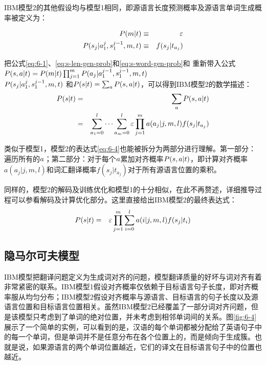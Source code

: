 \parinterval IBM模型2的其他假设均与模型1相同，即源语言长度预测概率及源语言单词生成概率被定义为：

\begin{eqnarray}
{P}(m|{t}) & \equiv & \varepsilon \label{eq:s-len-gen-prob} \\
{P}(s_j|a_1^{j},s_1^{j-1},m,{t}) & \equiv & f(s_j|t_{a_j})
\label{eq:s-word-gen-prob}
\end{eqnarray}

把公式\eqref{eq:6-1}、\eqref{eq:s-len-gen-prob}和\eqref{eq:s-word-gen-prob}和 重新带入公式${P}({s},{a}|{t})={P}(m|{t})\prod_{j=1}^{m}{{P}(a_j|a_1^{j-1},s_1^{j-1},m,{t})}$\\${{P}(s_j|a_1^{j},s_1^{j-1},m,{t})}$ 和${P}({s}|{t})= \sum_{{a}}{P}({s},{a}|{t})$，可以得到IBM模型2的数学描述：
\begin{eqnarray}
{P}({s}| {t}) & = &  \sum_{{a}}{{P}({s},{a}| {t})} \nonumber \\
                       & = & \sum_{a_1=0}^{l}{\cdots}\sum _{a_m=0}^{l}{\varepsilon}\prod_{j=1}^{m}{a(a_j|j,m,l)f(s_j|t_{a_j})}
\label{eq:6-4}
\end{eqnarray}

\parinterval 类似于模型1，模型2的表达式\eqref{eq:6-4}也能被拆分为两部分进行理解。第一部分：遍历所有的${a}$；第二部分：对于每个${a}$累加对齐概率${P}({s},{a}| {t})$，即计算对齐概率$a(a_j|j,m,l)$和词汇翻译概率$f(s_j|t_{a_j})$对于所有源语言位置的乘积。

\parinterval 同样的，模型2的解码及训练优化和模型1的十分相似，在此不再赘述，详细推导过程可以参看{\chapterfive}解码及计算优化部分。这里直接给出IBM模型2的最终表达式：
\begin{eqnarray}
{P}({s}| {t}) & = & \varepsilon \prod\limits_{j=1}^{m} \sum\limits_{i=0}^{l} a(i|j,m,l) f(s_j|t_i)
\label{eq:6-5}
\end{eqnarray}



\subsection{隐马尔可夫模型}

\parinterval IBM模型把翻译问题定义为生成词对齐的问题，模型翻译质量的好坏与词对齐有着非常紧密的联系。IBM模型1假设对齐概率仅依赖于目标语言句子长度，即对齐概率服从均匀分布；IBM模型2假设对齐概率与源语言、目标语言的句子长度以及源语言位置和目标语言位置相关。虽然IBM模型2已经覆盖了一部分词对齐问题，但是该模型只考虑到了单词的绝对位置，并未考虑到相邻单词间的关系。图\ref{fig:6-4} 展示了一个简单的实例，可以看到的是，汉语的每个单词都被分配给了英语句子中的每一个单词，但是单词并不是任意分布在各个位置上的，而是倾向于生成簇。也就是说，如果源语言的两个单词位置越近，它们的译文在目标语言句子中的位置也越近。


